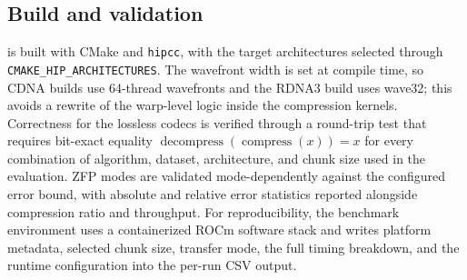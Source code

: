\subsection{Build and validation}
\label{sec:arcto-build}

\arcto{} is built with CMake and \texttt{hipcc}, with the target
architectures selected through \texttt{CMAKE\_HIP\_ARCHITECTURES}.
The wavefront width is set at compile time, so CDNA builds use
64-thread wavefronts and the RDNA3 build uses wave32; this avoids a
rewrite of the warp-level logic inside the compression kernels.
Correctness for the lossless codecs is verified through a round-trip
test that requires bit-exact equality
$\operatorname{decompress}(\operatorname{compress}(x)) = x$ for every
combination of algorithm, dataset, architecture, and chunk size used
in the evaluation. ZFP modes are validated mode-dependently against
the configured error bound, with absolute and relative error
statistics reported alongside compression ratio and throughput. For
reproducibility, the benchmark environment uses a containerized
ROCm software stack and writes platform metadata, selected chunk
size, transfer mode, the full timing breakdown, and the runtime
configuration into the per-run CSV output.

